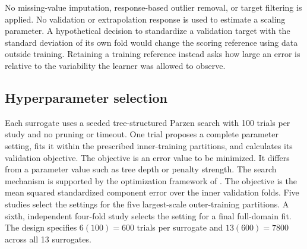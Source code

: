 No missing-value imputation, response-based outlier removal, or target filtering is applied. No validation or extrapolation response is used to estimate a scaling parameter. A hypothetical decision to standardize a validation target with the standard deviation of its own fold would change the scoring reference using data outside training. Retaining a training reference instead asks how large an error is relative to the variability the learner was allowed to observe.

\subsection{Hyperparameter selection}

Each surrogate uses a seeded tree-structured Parzen search with 100 trials per study and no pruning or timeout. One trial proposes a complete parameter setting, fits it within the prescribed inner-training partitions, and calculates its validation objective. The objective is an error value to be minimized. It differs from a parameter value such as tree depth or penalty strength. The search mechanism is supported by the optimization framework of \citet{Akiba2019}. The objective is the mean squared standardized component error over the inner validation folds. Five studies select the settings for the five largest-scale outer-training partitions. A sixth, independent four-fold study selects the setting for a final full-domain fit. The design specifies $6(100)=600$ trials per surrogate and $13(600)=7800$ across all 13 surrogates.

